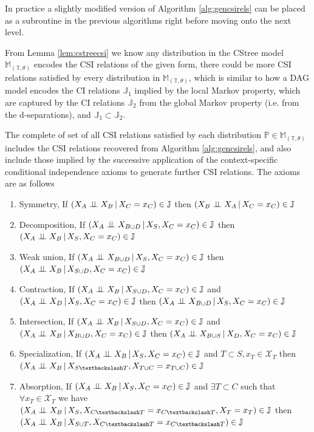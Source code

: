 \documentclass{tufte-book}
\begin{document}
In practice a slightly modified version of Algorithm \ref{alg:gencsirels} can be placed as a subroutine in the previous algorithms right before moving onto the next level.


From Lemma \ref{lem:cstreecsi} we know any distribution in the CStree model \(\mathbb{M}_{(\mathbb{T},\theta)}\) encodes the CSI relations of the given form, there could be more CSI relations satisfied by every distribution in \(\mathbb{M}_{(\mathbb{T},\theta)}\), which is similar to how a DAG model encodes the CI relations \(\mathbb{J}_1\) implied by the local Markov property, which are captured by the CI relations \(\mathbb{J}_2\) from the global Markov property (i.e. from the d-separations), and \(\mathbb{J}_1 \subset \mathbb{J}_2\).


The complete of set of all CSI relations satisfied by each distribution \(\mathbb{P} \in \mathbb{M}_{(\mathbb{T},\theta)}\) includes the CSI relations recovered from Algorithm \ref{alg:gencsirels}, and also include those implied by the successive application of the context-specific conditional independence axioms to generate further CSI relations. The axioms are as follows


\begin{enumerate}
\item Symmetry, If \((X_A \perp \!\!\! \perp X_B \,|\, X_C=x_C) \in \mathbb{J}\) then \((X_B \perp \!\!\! \perp X_A \,|\, X_C=x_C) \in \mathbb{J}\)
\item Decomposition, If \((X_A \perp \!\!\! \perp X_{B \cup D} \,|\, X_S, X_C=x_C) \in \mathbb{J}\) then \((X_A \perp \!\!\! \perp X_B \,|\, X_S, X_C=x_C) \in \mathbb{J}\)
\item Weak union, If \((X_A \perp \!\!\! \perp X_{B \cup D} \,|\, X_S, X_C=x_C) \in \mathbb{J}\) then \((X_A \perp \!\!\! \perp X_{B} \,|\, X_{S \cup D}, X_C=x_C) \in \mathbb{J}\)
\item Contraction, If \((X_A \perp \!\!\! \perp X_B \,|\, X_{S \cup D}, X_C=x_C) \in \mathbb{J}\) and \((X_A \perp \!\!\! \perp X_D \,|\,X_S, X_C=x_C) \in \mathbb{J}\) then \((X_A \perp \!\!\! \perp X_{B \cup D} \,|\, X_S, X_C=x_C) \in \mathbb{J}\)
\item Intersection,  If \((X_A \perp \!\!\! \perp X_B \,|\, X_{S \cup D}, X_C=x_C) \in \mathbb{J}\) and  \((X_A \perp \!\!\! \perp X_B \,|\, X_{B \cup D}, X_C=x_C) \in \mathbb{J}\) then  \((X_A \perp \!\!\! \perp X_{B \cup S} \,|\, X_D, X_C=x_C) \in \mathbb{J}\)
\item Specialization, If \((X_A \perp \!\!\! \perp X_B \,|\, X_S, X_C=x_C) \in \mathbb{J}\) and \(T \subset S, x_T \in \mathcal{X}_T\) then \((X_A \indep X_B \,|\, X_{S \textbackslash T}, X_{T \cup C} = x_{T \cup C}) \in \mathbb{J}\)
\item Absorption, If \((X_A \perp \!\!\! \perp X_B \,|\, X_S, X_C=x_C) \in \mathbb{J}\) and \(\exists T \subset C\) such that \(\forall x_T \in \mathcal{X}_T\) we have \((X_A \indep X_B \,|\, X_S, X_{C\textbackslash T}=x_{C \textbackslash T}, X_T=x_T) \in \mathbb{J}\) then \((X_A \indep X_B \,|\, X_{S \cup T}, X_{C \textbackslash T}=x_{C \textbackslash T}) \in \mathbb{J}\)
\end{enumerate}
\end{document}
